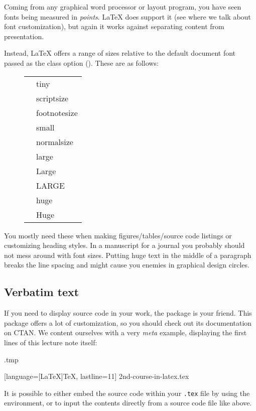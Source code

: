 Coming from any graphical word processor or layout program,
you have seen fonts being measured in \emph{points}.
\LaTeX{} does support it (see  where we talk about font customization),
but again it works against separating content from presentation.

Instead, \LaTeX{} offers a range of sizes relative to the default document font
passed as the class option ().
These are as follows:
%
\begin{figure}[h]
\centering
\newcommand{\example}[1]{\cmd{#1}\texttt &%
    \csname#1\endcsname{Example text}}
\begin{tabular}{l|l}
\example{tiny}\\
\example{scriptsize}\\
\example{footnotesize}\\
\example{small}\\
\example{normalsize}\\
\example{large}\\
\example{Large}\\
\example{LARGE}\\
\example{huge}\\
\example{Huge}
\end{tabular}
\end{figure}

You mostly need these when making figures/tables/source code listings
or customizing heading styles.
In a manuscript for a journal you probably should not mess around with font sizes.
Putting {\huge huge text} in the middle of a paragraph
breaks the line spacing and might cause you enemies in graphical design circles.


%
%
\subsection{Verbatim text}

If you need to display source code in your work,
the  package is your friend.
This package offers a lot of customization,
so you should check out its documentation on CTAN.
We content ourselves with a very \emph{meta} example,
displaying the first lines of this lecture note itself:
%
\begin{VerbatimOut}{\jobname.tmp}


  [language={[LaTeX]TeX}, lastline=11]
  {2nd-course-in-latex.tex}
\end{VerbatimOut}
\ShowExample
%
It is possible to either embed the source code within your \verb|.tex| file
by using the  environment,
or to input the contents directly from a source code file like above.

